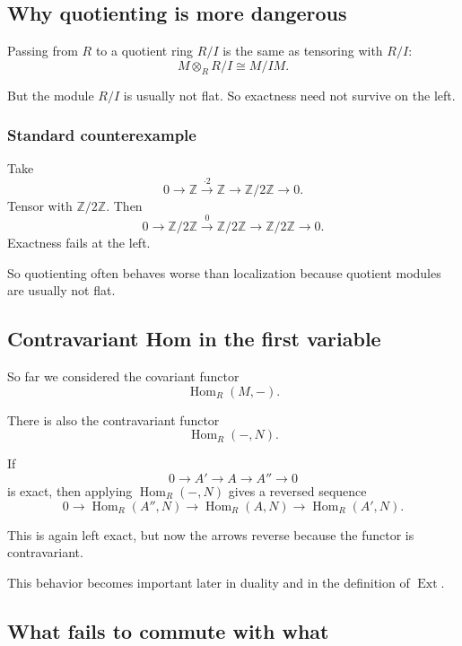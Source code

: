 \documentclass[12pt,a4paper]{article}
\theoremstyle{notespace}
\theoremstyle{definition}
\begin{document}
\subsection{ Why quotienting is more dangerous}

Passing from \(R\) to a quotient ring \(R/I\) is the same as tensoring with \(R/I\):
\[
M\otimes_R R/I \cong M/IM.
\]

But the module \(R/I\) is usually not flat.
So exactness need not survive on the left.

\subsubsection*{Standard counterexample}

Take
\[
0 \longrightarrow \mathbb Z \xrightarrow{\cdot 2} \mathbb Z \longrightarrow \mathbb Z/2\mathbb Z \longrightarrow 0.
\]
Tensor with \(\mathbb Z/2\mathbb Z\). Then
\[
0 \longrightarrow \mathbb Z/2\mathbb Z \xrightarrow{0} \mathbb Z/2\mathbb Z
\longrightarrow \mathbb Z/2\mathbb Z \longrightarrow 0.
\]
Exactness fails at the left.

So quotienting often behaves worse than localization because quotient modules are usually not flat.

\subsection{ Contravariant Hom in the first variable}

So far we considered the covariant functor
\[
\operatorname{Hom}_R(M,-).
\]

There is also the contravariant functor
\[
\operatorname{Hom}_R(-,N).
\]

If
\[
0 \longrightarrow A' \longrightarrow A \longrightarrow A'' \longrightarrow 0
\]
is exact, then applying \(\operatorname{Hom}_R(-,N)\) gives a reversed sequence
\[
0 \longrightarrow \operatorname{Hom}_R(A'',N)
\longrightarrow \operatorname{Hom}_R(A,N)
\longrightarrow \operatorname{Hom}_R(A',N).
\]

This is again left exact, but now the arrows reverse because the functor is contravariant.

This behavior becomes important later in duality and in the definition of \(\operatorname{Ext}\).

\subsection{ What fails to commute with what}
\end{document}
